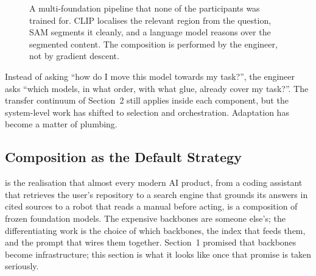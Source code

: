 \begin{figure}
\centering
{}
\caption{A multi-foundation pipeline that none of the participants was trained for. CLIP localises the relevant region from the question, SAM segments it cleanly, and a language model reasons over the segmented content. The composition is performed by the engineer, not by gradient descent.}
\label{fig:multi_foundation}
\end{figure}

 Instead of asking ``how do I move this model towards my task?'', the engineer asks ``which models, in what order, with what glue, already cover my task?''. The transfer continuum of Section~2 still applies inside each component, but the system-level work has shifted to selection and orchestration. Adaptation has become a matter of plumbing.

\subsection{Composition as the Default Strategy}

 is the realisation that almost every modern AI product, from a coding assistant that retrieves the user's repository to a search engine that grounds its answers in cited sources to a robot that reads a manual before acting, is a composition of frozen foundation models. The expensive backbones are someone else's; the differentiating work is the choice of which backbones, the index that feeds them, and the prompt that wires them together. Section~1 promised that backbones become infrastructure; this section is what it looks like once that promise is taken seriously.


